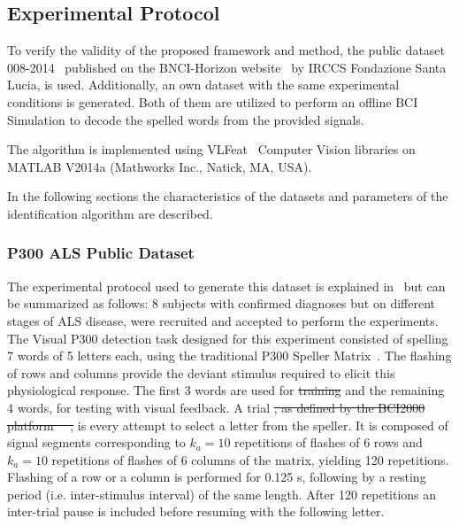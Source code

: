 \documentclass[utf8]{frontiersSCNS} %
\providecommand{\DIFaddtex}[1]{{\protect\color{blue}\uwave{#1}}} %
\providecommand{\DIFdeltex}[1]{{\protect\color{red}\sout{#1}}}                      %
\providecommand{\DIFaddbegin}{} %
\providecommand{\DIFaddend}{} %
\providecommand{\DIFdelbegin}{} %
\providecommand{\DIFdelend}{} %
\providecommand{\DIFadd}[1]{\texorpdfstring{\DIFaddtex{#1}}{#1}} %
\providecommand{\DIFdel}[1]{\texorpdfstring{\DIFdeltex{#1}}{}} %
\begin{document}
\subsection{Experimental Protocol} \label{Protocol}

To verify the validity of the proposed framework and method, the public dataset 008-2014~\citep{Riccio2013} published on the BNCI-Horizon website~\citep{Brunner2014} by  IRCCS Fondazione Santa Lucia, is used. Additionally, an own dataset with the same experimental conditions is generated. Both of them are utilized to perform an offline BCI Simulation to decode the spelled words from the provided signals. 

The algorithm is implemented using  VLFeat~\citep{Vedaldi2010} Computer Vision libraries on MATLAB V2014a (Mathworks Inc., Natick, MA, USA). 

In the following sections the characteristics of the datasets and parameters of the identification algorithm are described. 

\DIFaddbegin 

\DIFaddend \subsubsection{P300 ALS Public Dataset} \label{ALSDataset}

The experimental protocol used to generate this dataset is explained in~\citep{Riccio2013} but can be summarized as follows:  8 subjects with confirmed diagnoses but on different stages of ALS disease, were recruited and accepted to perform the experiments. The Visual P300 detection task designed for this experiment consisted of spelling 7 words of 5 letters each, using the traditional P300 Speller Matrix~\citep{Farwell1988}. The flashing of rows and columns provide the deviant stimulus required to elicit this physiological response.  The first 3 words are used for \DIFdelbegin \DIFdel{training }\DIFdelend \DIFaddbegin \DIFadd{calibration }\DIFaddend and the remaining 4 words, for testing with visual feedback.  A trial \DIFdelbegin \DIFdel{, as defined by the BCI2000 platform~\mbox{%
\citep{Schalk2004}}\hspace{0pt}%
, }\DIFdelend is every attempt to select a letter from the speller. It is composed of signal segments corresponding to $k_a =10$ repetitions of flashes of 6 rows and $k_a =10$ repetitions of flashes of 6 columns of the matrix, yielding 120 repetitions.  Flashing of a row or a column is performed for 0.125 s, following by a resting period (i.e. inter-stimulus interval) of the same length.  After 120 repetitions an inter-trial pause is included before resuming with the following letter.
\end{document}
